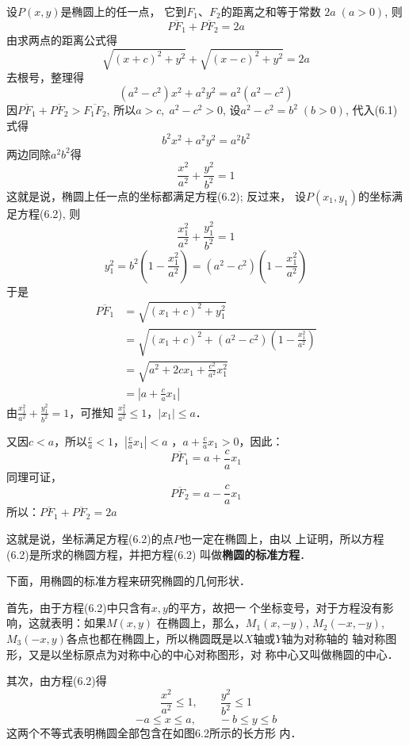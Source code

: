 设$P(x,y)$是椭圆上的任一点，
它到$F_1$、$F_2$的距离之和等于常数
$2a\; (a>0)$, 则
\[\overline{PF_1}+\overline{PF_2}=2a\]
由求两点的距离公式得
\[\sqrt{(x+c)^2+y^2}+\sqrt{(x-c)^2+y^2}=2a\]
去根号，整理得
\begin{equation}
    (a^2-c^2)x^2+a^2y^2=a^2(a^2-c^2)
\end{equation}
因$\overline{PF_1}+\overline{PF_2}>\overline{F_1F_2}$, 所以$a>c,\; a^2-c^2>0$, 
设$a^2-c^2=b^2\; (b>0)$, 代入(6.1)式得
\[b^2x^2+a^2y^2=a^2b^2\]
两边同除$a^2b^2$得
\begin{equation}
 \boxed{\frac{x^2}{a^2}+\frac{y^2}{b^2}=1}   
\end{equation}
这就是说，椭圆上任一点的坐标都满足方程(6.2); 反过来，
设$P(x_1,y_1)$的坐标满足方程(6.2), 则
\[\frac{x_1^2}{a^2}+\frac{y_1^2}{b^2}=1\]
\[y^2_1=b^2\left(1-\frac{x^2_1}{a^2}\right)=(a^2-c^2)\left(1-\frac{x^2_1}{a^2}\right)\]
于是
\[\begin{split}
    \overline{PF_1}&=\sqrt{(x_1+c)^2+y^2_1}\\
    &=\sqrt{(x_1+c)^2+(a^2-c^2)\left(1-\frac{x^2_1}{a^2}\right)}\\
    &=\sqrt{a^2+2cx_1+\frac{c^2}{a^2}x^2_1}\\
    &=\left|a+\frac{c}{a}x_1\right|
\end{split}\]
由$\frac{x_1^2}{a^2}+\frac{y_1^2}{b^2}=1$，可推知
$\frac{x_1^2}{a^2}\le 1$，$|x_1|\le a$．

又因$c<a$，所以$\frac{c}{a}<1$，$\left|\frac{c}{a}x_1\right|<a$
，$a+\frac{c}{a}x_1>0$，因此：
\begin{equation}
    \overline{PF_1}=a+\frac{c}{a}x_1
\end{equation}
同理可证，
\[\overline{PF_2}=a-\frac{c}{a}x_1\]
所以：$\overline{PF_1}+\overline{PF_2}=2a$

这就是说，坐标满足方程(6.2)的点$P$也一定在椭圆上，由以
上证明，所以方程(6.2)是所求的椭圆方程，并把方程(6.2)
叫做\textbf{椭圆的标准方程}．

下面，用椭圆的标准方程来研究椭圆的几何形状．

首先，由于方程(6.2)中只含有$x,y$的平方，故把一
个坐标变号，对于方程没有影响，这就表明：如果$M(x,y)$
在椭圆上，那么，$M_1(x,-y)$, $M_2(-x,-y)$, $M_3(-x,
y)$各点也都在椭圆上，所以椭圆既是以$X$轴或$Y$轴为对称轴的
轴对称图形，又是以坐标原点为对称中心的中心对称图形，对
称中心又叫做椭圆的中心．

其次，由方程(6.2)得
\[\frac{x^2}{a^2}\le 1,\qquad \frac{y^2}{b^2}\le 1\]
\[-a\le x\le a,\qquad -b\le y\le b\]
这两个不等式表明椭圆全部包含在如图6.2所示的长方形
内．

